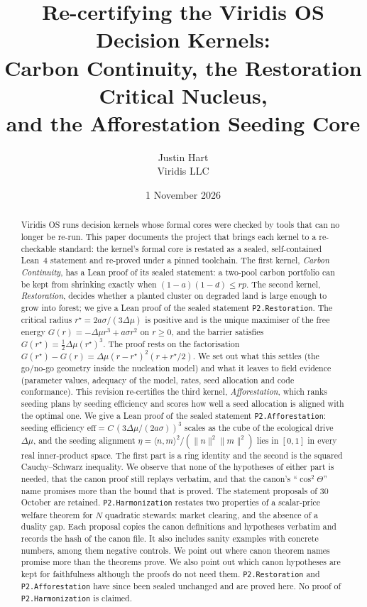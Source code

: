\documentclass[11pt]{article}
\title{Re-certifying the Viridis OS Decision Kernels:\\ Carbon Continuity, the Restoration Critical Nucleus,\\ and the Afforestation Seeding Core}
\author{Justin Hart\\ Viridis LLC}
\date{1 November 2026}
\theoremstyle{definition}
\theoremstyle{remark}
\begin{document}
\maketitle

\begin{abstract}
Viridis OS runs decision kernels whose formal cores were checked by tools that can no longer be re-run.
This paper documents the project that brings each kernel to a re-checkable standard: the kernel's formal core is restated as a
sealed, self-contained Lean~4 statement and re-proved under a pinned toolchain.
The first kernel, \emph{Carbon Continuity}, has a Lean proof of its sealed statement: a two-pool carbon portfolio can be kept
from shrinking exactly when $(1-a)(1-d)\le rp$.
The second kernel, \emph{Restoration}, decides whether a planted cluster on degraded
land is large enough to grow into forest; we give a Lean proof of the sealed statement \texttt{P2.Restoration}.
The critical radius $r^\star=2a\sigma/(3\Delta\mu)$ is positive and is the unique maximiser of the free energy
$G(r)=-\Delta\mu r^3+a\sigma r^2$ on $r\ge 0$, and the barrier satisfies $G(r^\star)=\tfrac12\Delta\mu (r^\star)^3$.
The proof rests on the factorisation $G(r^\star)-G(r)=\Delta\mu(r-r^\star)^2(r+r^\star/2)$.
We set out what this settles (the go/no-go geometry inside the nucleation model) and what it leaves to field
evidence (parameter values, adequacy of the model, rates, seed allocation and code conformance).
This revision re-certifies the third kernel, \emph{Afforestation}, which ranks seeding plans by seeding efficiency
and scores how well a seed allocation is aligned with the optimal one.
We give a Lean proof of the sealed statement \texttt{P2.Afforestation}: seeding efficiency
$\mathrm{eff}=C\,(3\Delta\mu/(2a\sigma))^3$ scales as the cube of the ecological drive $\Delta\mu$, and the seeding
alignment $\eta=\langle n,m\rangle^2/(\|n\|^2\|m\|^2)$ lies in $[0,1]$ in every real inner-product space.
The first part is a ring identity and the second is the squared Cauchy--Schwarz inequality.
We observe that none of the hypotheses of either part is needed, that the canon proof still replays verbatim,
and that the canon's ``$\cos^2\Theta$'' name promises more than the bound that is proved.
The statement proposals of 30 October are retained.
\texttt{P2.Harmonization} restates two properties of a scalar-price welfare theorem for $N$ quadratic stewards: market clearing,
and the absence of a duality gap.
Each proposal copies the canon definitions and hypotheses verbatim and records the hash of the canon file.
It also includes sanity examples with concrete numbers, among them negative controls.
We point out where canon theorem names promise more than the theorems prove.
We also point out which canon hypotheses are kept for faithfulness although the proofs do not need them.
\texttt{P2.Restoration} and \texttt{P2.Afforestation} have since been sealed unchanged and are proved here.
No proof of \texttt{P2.Harmonization} is claimed.
\end{abstract}
\end{document}
